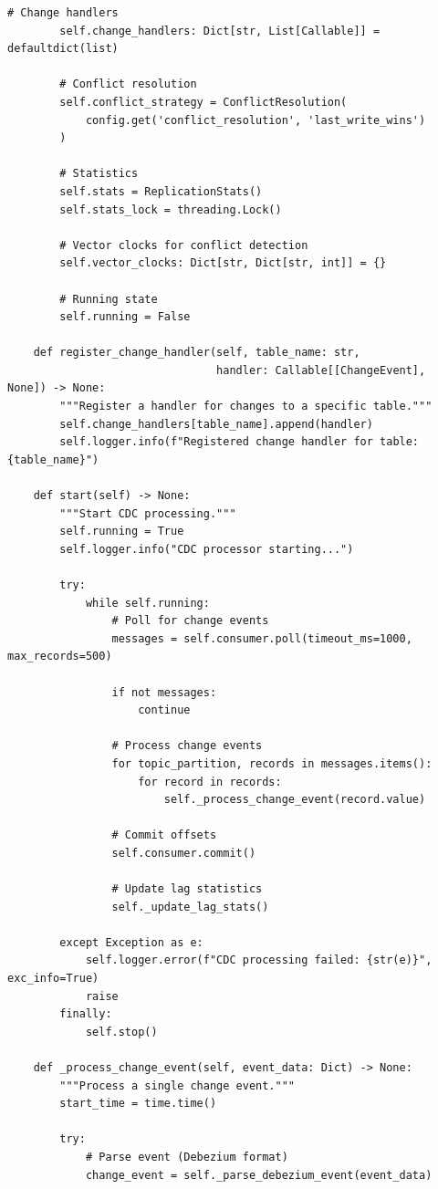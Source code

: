 \begin{lstlisting}[style=python, caption=CDCProcessor with Change Stream Handling]
        # Change handlers
        self.change_handlers: Dict[str, List[Callable]] = defaultdict(list)

        # Conflict resolution
        self.conflict_strategy = ConflictResolution(
            config.get('conflict_resolution', 'last_write_wins')
        )

        # Statistics
        self.stats = ReplicationStats()
        self.stats_lock = threading.Lock()

        # Vector clocks for conflict detection
        self.vector_clocks: Dict[str, Dict[str, int]] = {}

        # Running state
        self.running = False

    def register_change_handler(self, table_name: str,
                                handler: Callable[[ChangeEvent], None]) -> None:
        """Register a handler for changes to a specific table."""
        self.change_handlers[table_name].append(handler)
        self.logger.info(f"Registered change handler for table: {table_name}")

    def start(self) -> None:
        """Start CDC processing."""
        self.running = True
        self.logger.info("CDC processor starting...")

        try:
            while self.running:
                # Poll for change events
                messages = self.consumer.poll(timeout_ms=1000, max_records=500)

                if not messages:
                    continue

                # Process change events
                for topic_partition, records in messages.items():
                    for record in records:
                        self._process_change_event(record.value)

                # Commit offsets
                self.consumer.commit()

                # Update lag statistics
                self._update_lag_stats()

        except Exception as e:
            self.logger.error(f"CDC processing failed: {str(e)}", exc_info=True)
            raise
        finally:
            self.stop()

    def _process_change_event(self, event_data: Dict) -> None:
        """Process a single change event."""
        start_time = time.time()

        try:
            # Parse event (Debezium format)
            change_event = self._parse_debezium_event(event_data)


\end{lstlisting}
